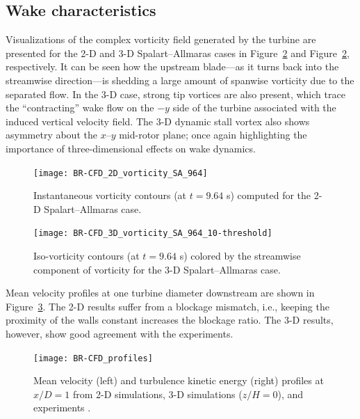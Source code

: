 \documentclass[aip,graphicx]{revtex4-1}
\begin{document}
\subsection{Wake characteristics}

Visualizations of the complex vorticity field generated by the turbine are
presented for the 2-D and 3-D Spalart--Allmaras cases in
Figure~\ref{fig:br-vorticity-3d} and Figure~\ref{fig:br-vorticity-3d},
respectively. It can be seen how the upstream blade---as it turns back into the
streamwise direction---is shedding a large amount of spanwise vorticity due to
the separated flow. In the 3-D case, strong tip vortices are also present, which
trace the ``contracting'' wake flow on the $-y$ side of the turbine associated
with the induced vertical velocity field. The 3-D dynamic stall vortex also
shows asymmetry about the $x$--$y$ mid-rotor plane; once again highlighting the
importance of three-dimensional effects on wake dynamics.

\begin{figure}
    \centering
    
    \texttt{[image: BR-CFD\_2D\_vorticity\_SA\_964]}
    
    \caption{Instantaneous vorticity contours (at $t=9.64$ s) computed for the
        2-D Spalart--Allmaras case.}
    
    \label{fig:br-vorticity-2d}
\end{figure}

\begin{figure}
    \centering
    
    \texttt{[image: BR-CFD\_3D\_vorticity\_SA\_964\_10-threshold]}
    
    \caption{Iso-vorticity contours (at $t=9.64$ s) colored by the streamwise
        component of vorticity for the 3-D Spalart--Allmaras case.}
    
    \label{fig:br-vorticity-3d}
\end{figure}

Mean velocity profiles at one turbine diameter downstream are shown in
Figure~\ref{fig:br-cfd-profiles}. The 2-D results suffer from a blockage
mismatch, i.e., keeping the proximity of the walls constant increases the
blockage ratio. The 3-D results, however, show good agreement with the
experiments.

\begin{figure}
    \centering
    
    \texttt{[image: BR-CFD\_profiles]}
    
    \caption{Mean velocity (left) and turbulence kinetic energy (right) profiles
        at $x/D=1$ from 2-D simulations, 3-D simulations ($z/H=0$), and experiments
        \cite{Bachant2015-JoT}.}
    
    \label{fig:br-cfd-profiles}
\end{figure}
\end{document}
